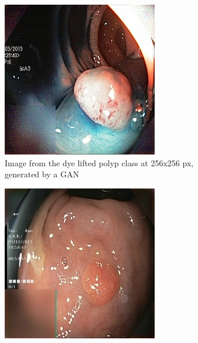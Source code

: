 \begin{figure}
\begin{subfigure}[t]{0.4\textwidth}
            \includegraphics[width=\textwidth]{experiments/figures/both/DLGAN.jpg}
            \caption{Image from the dye lifted polyp class at 256x256 px, generated by a GAN}    
            \label{fig:dlp_GAN_BOTH2}
        \end{subfigure}
        \qquad\vfill%
        \begin{subfigure}[t]{0.4\textwidth}   
            \centering 
            \includegraphics[width=\textwidth]{experiments/figures/both/greenAE.jpg}

\end{subfigure}
\end{figure}

